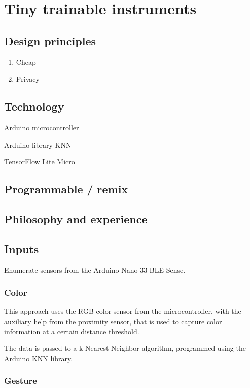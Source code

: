 \chapter{Tiny trainable instruments}

\section{Design principles}

\begin{enumerate}
  \item Cheap
  \item Privacy
\end{enumerate}

\section{Technology}

Arduino microcontroller

Arduino library KNN

TensorFlow Lite Micro

\section{Programmable / remix}

\section{Philosophy and experience}

\section{Inputs}

Enumerate sensors from the Arduino Nano 33 BLE Sense.

\subsection{Color}

This approach uses the RGB color sensor from the microcontroller, with the auxiliary help from the proximity sensor, that is used to capture color information at a certain distance threshold.

The data is passed to a k-Nearest-Neighbor algorithm, programmed using the Arduino KNN library.

\subsection{Gesture}

